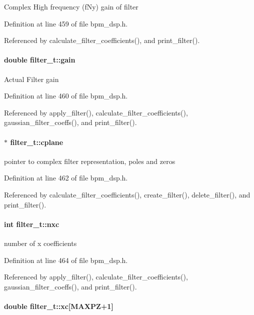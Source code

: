 Complex High frequency (fNy) gain of filter 

Definition at line 459 of file bpm\_\-dsp.h.

Referenced by calculate\_\-filter\_\-coefficients(), and print\_\-filter().
\paragraph[gain]{\setlength{\rightskip}{0pt plus 5cm}double {\bf filter\_\-t::gain}}\hfill\label{structfilter__t_9f8ff8688cc79f123f63209d62073677}


Actual Filter gain 

Definition at line 460 of file bpm\_\-dsp.h.

Referenced by apply\_\-filter(), calculate\_\-filter\_\-coefficients(), gaussian\_\-filter\_\-coeffs(), and print\_\-filter().
\paragraph[cplane]{$\ast$ {\bf filter\_\-t::cplane}}\hfill\label{structfilter__t_d60ad283b3847bcf61069cb0aecb3a84}


pointer to complex filter representation, poles and zeros 

Definition at line 462 of file bpm\_\-dsp.h.

Referenced by calculate\_\-filter\_\-coefficients(), create\_\-filter(), delete\_\-filter(), and print\_\-filter().
\paragraph[nxc]{\setlength{\rightskip}{0pt plus 5cm}int {\bf filter\_\-t::nxc}}\hfill\label{structfilter__t_0a4cebb1e641ab50077f260ad11c7788}


number of x coefficients 

Definition at line 464 of file bpm\_\-dsp.h.

Referenced by apply\_\-filter(), calculate\_\-filter\_\-coefficients(), gaussian\_\-filter\_\-coeffs(), and print\_\-filter().
\paragraph[xc]{\setlength{\rightskip}{0pt plus 5cm}double {\bf filter\_\-t::xc}[MAXPZ+1]}\hfill\label{structfilter__t_22b9df0209c051f2ddc148486e7d6f8a}


